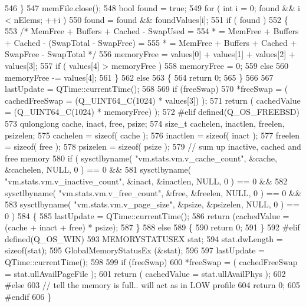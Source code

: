 \begin{DoxyCode}
546     \}
547     memFile.close();
548     \textcolor{keywordtype}{bool} found = \textcolor{keyword}{true};
549     \textcolor{keywordflow}{for} ( \textcolor{keywordtype}{int} i = 0; found && i < nElems; ++i )
550         found = found && foundValues[i];
551     \textcolor{keywordflow}{if} ( found )
552     \{
553         \textcolor{comment}{/* MemFree + Buffers + Cached - SwapUsed =}
554 \textcolor{comment}{         * = MemFree + Buffers + Cached - (SwapTotal - SwapFree) =}
555 \textcolor{comment}{         * = MemFree + Buffers + Cached + SwapFree - SwapTotal */}
556         memoryFree = values[0] + values[1] + values[2] + values[3];
557         \textcolor{keywordflow}{if} ( values[4] > memoryFree )
558             memoryFree = 0;
559         \textcolor{keywordflow}{else}
560             memoryFree -= values[4];
561     \}
562     \textcolor{keywordflow}{else}
563     \{
564         \textcolor{keywordflow}{return} 0;
565     \}
566 
567     lastUpdate = QTime::currentTime();
568 
569     \textcolor{keywordflow}{if} (freeSwap)
570         *freeSwap = ( cachedFreeSwap = (Q\_UINT64\_C(1024) * values[3]) );
571     \textcolor{keywordflow}{return} ( cachedValue = (Q\_UINT64\_C(1024) * memoryFree) );
572 \textcolor{preprocessor}{#elif defined(Q\_OS\_FREEBSD)}
573     qulonglong cache, inact, free, psize;
574     \textcolor{keywordtype}{size\_t} cachelen, inactlen, freelen, psizelen;
575     cachelen = \textcolor{keyword}{sizeof}( cache );
576     inactlen = \textcolor{keyword}{sizeof}( inact );
577     freelen = \textcolor{keyword}{sizeof}( free );
578     psizelen = \textcolor{keyword}{sizeof}( psize );
579     \textcolor{comment}{// sum up inactive, cached and free memory}
580     \textcolor{keywordflow}{if} ( sysctlbyname( \textcolor{stringliteral}{"vm.stats.vm.v\_cache\_count"}, &cache, &cachelen, NULL, 0 ) == 0 &&
581             sysctlbyname( \textcolor{stringliteral}{"vm.stats.vm.v\_inactive\_count"}, &inact, &inactlen, NULL, 0 ) == 0 &&
582             sysctlbyname( \textcolor{stringliteral}{"vm.stats.vm.v\_free\_count"}, &free, &freelen, NULL, 0 ) == 0 &&
583             sysctlbyname( \textcolor{stringliteral}{"vm.stats.vm.v\_page\_size"}, &psize, &psizelen, NULL, 0 ) == 0 )
584     \{
585         lastUpdate = QTime::currentTime();
586         \textcolor{keywordflow}{return} (cachedValue = (cache + inact + free) * psize);
587     \}
588     \textcolor{keywordflow}{else}
589     \{
590         \textcolor{keywordflow}{return} 0;
591     \}
592 \textcolor{preprocessor}{#elif defined(Q\_OS\_WIN)}
593     MEMORYSTATUSEX stat;
594     stat.dwLength = \textcolor{keyword}{sizeof}(stat);
595     GlobalMemoryStatusEx (&stat);
596 
597     lastUpdate = QTime::currentTime();
598 
599     \textcolor{keywordflow}{if} (freeSwap)
600         *freeSwap = ( cachedFreeSwap = stat.ullAvailPageFile );
601     \textcolor{keywordflow}{return} ( cachedValue = stat.ullAvailPhys );
602 \textcolor{preprocessor}{#else}
603     \textcolor{comment}{// tell the memory is full.. will act as in LOW profile}
604     \textcolor{keywordflow}{return} 0;
605 \textcolor{preprocessor}{#endif}
606 \}
\end{DoxyCode}
